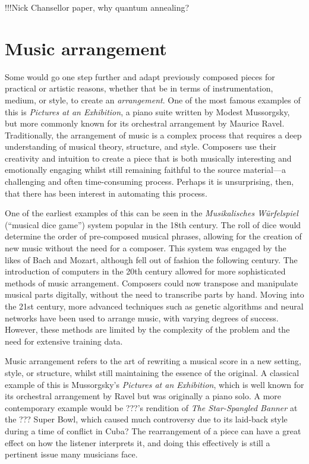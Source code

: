 \documentclass[12pt]{article}
\theoremstyle{definition}
\begin{document}
!!!Nick Chansellor paper, why quantum annealing?

\section{Music arrangement}
\label{sec:arrangement}

Some would go one step further and adapt previously composed pieces for practical or artistic reasons, whether that be in terms of instrumentation, medium, or style, to create an \textit{arrangement}. One of the most famous examples of this is \textit{Pictures at an Exhibition}, a piano suite written by Modest Mussorgsky, but more commonly known for its orchestral arrangement by Maurice Ravel.
Traditionally, the arrangement of music is a complex process that requires a deep understanding of musical theory, structure, and style. Composers use their creativity and intuition to create a piece that is both musically interesting and emotionally engaging whilst still remaining faithful to the source material—a challenging and often time-consuming process. Perhaps it is unsurprising, then, that there has been interest in automating this process.

One of the earliest examples of this can be seen in the \textit{Musikalisches Würfelspiel} (``musical dice game'') system popular in the 18th century. The roll of dice would determine the order of pre-composed musical phrases, allowing for the creation of new music without the need for a composer. This system was engaged by the likes of Bach and Mozart, although fell out of fashion the following century.
The introduction of computers in the 20th century allowed for more sophisticated methods of music arrangement. Composers could now transpose and manipulate musical parts digitally, without the need to transcribe parts by hand. Moving into the 21st century, more advanced techniques such as genetic algorithms and neural networks have been used to arrange music, with varying degrees of success. However, these methods are limited by the complexity of the problem and the need for extensive training data.

Music arrangement refers to the art of rewriting a musical score in a new setting, style, or structure, whilst still maintaining the essence of the original. A classical example of this is Mussorgsky's \emph{Pictures at an Exhibition}, which is well known for its orchestral arrangement by Ravel but was originally a piano solo. A more contemporary example would be ???'s rendition of \emph{The Star-Spangled Banner} at the ??? Super Bowl, which caused much controversy due to its laid-back style during a time of conflict in Cuba? The rearrangement of a piece can have a great effect on how the listener interprets it, and doing this effectively is still a pertinent issue many musicians face.
\end{document}
